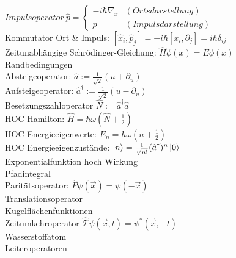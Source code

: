 \documentclass{article}
\begin{document}
$Impulsoperator\ \hat{p}=\left\{\begin{array}{ll}  
- i \hbar \nabla_x & (Ortsdarstellung) \\
p & (Impulsdarstellung)
\end{array}\right.$ \\

Kommutator Ort \& Impuls: $[ \hat{x}_i, \hat{p}_j] = - i \hbar \left[x_i, \partial_j\right] = i \hbar \delta_{ij}$ \\

Zeitunabh\"angige Schr\"odinger-Gleichung: $\hat{H}\phi(x) = E \phi(x)$ \\

Randbedingungen \\

Absteigeoperator: $\hat{a} := \frac{1}{\sqrt{2}} (u + \partial_u)$ \\

Aufsteigeoperator: $\hat{a}^{\dagger} := \frac{1}{\sqrt{2}} (u - \partial_u)$ \\

Besetzungszahloperator $\hat{N} := \hat{a}^{\dagger} \hat{a} $ \\

HOC Hamilton: $ \hat{H} = \hbar \omega \left( \hat{N} + \frac{1}{2} \right) $ \\

HOC Energieeigenwerte: $ E_n = \hbar \omega \left( n + \frac{1}{2} \right)$\\

HOC Energieeigenzust\"ande: $\ket{n} = \frac{1}{\sqrt{n!}}(\hat{a}^{\dagger})^n \ket{0}$ \\

Exponentialfunktion hoch Wirkung \\

Pfadintegral \\

Parit\"atsoperator: $\hat{P}\psi(\vec{x}) = \psi(-\vec{x}) $ \\

Translationsoperator \\

Kugelfl\"achenfunktionen \\

Zeitumkehroperator $\hat{\mathcal{T}}\psi(\vec{x}, t) = \psi^*(\vec{x}, -t)$\\

Wasserstoffatom \\

Leiteroperatoren \\
\end{document}
